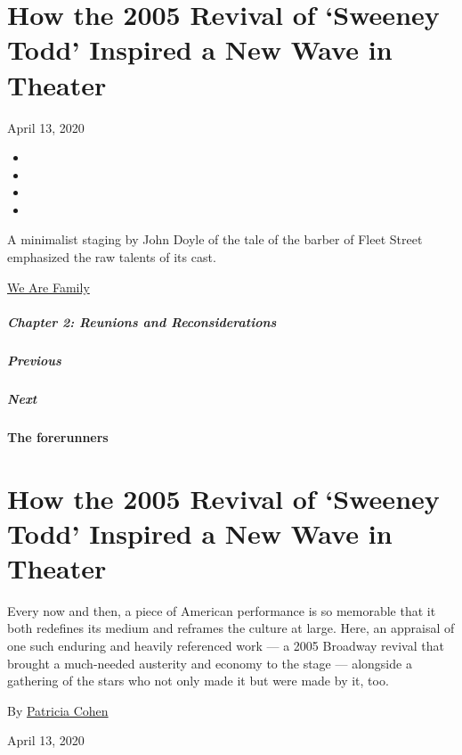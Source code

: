 \hypertarget{how-the-2005-revival-of-sweeney-todd-inspired-a-new-wave-in-theater}{%
\section{How the 2005 Revival of `Sweeney Todd' Inspired a New Wave in
Theater}\label{how-the-2005-revival-of-sweeney-todd-inspired-a-new-wave-in-theater}}

April 13, 2020

\begin{itemize}
\item
\item
\item
\item
\end{itemize}

A minimalist staging by John Doyle of the tale of the barber of Fleet
Street emphasized the raw talents of its cast.

\href{https://www.nytimes.com/interactive/2020/04/13/t-magazine/culture-issue-2020.html}{We
Are Family}

\hypertarget{chapter-2-reunions-and-reconsiderations}{%
\subparagraph{Chapter 2: Reunions and
Reconsiderations}\label{chapter-2-reunions-and-reconsiderations}}

\hypertarget{previous}{%
\subparagraph{Previous}\label{previous}}

\hypertarget{next}{%
\subparagraph{Next}\label{next}}

\textbf{The forerunners}

\hypertarget{how-the-2005-revival-of-sweeney-todd-inspired-a-new-wave-in-theater-1}{%
\section{How the 2005 Revival of `Sweeney Todd' Inspired a New Wave in
Theater}\label{how-the-2005-revival-of-sweeney-todd-inspired-a-new-wave-in-theater-1}}

Every now and then, a piece of American performance is so memorable that
it both redefines its medium and reframes the culture at large. Here, an
appraisal of one such enduring and heavily referenced work --- a 2005
Broadway revival that brought a much-needed austerity and economy to the
stage --- alongside a gathering of the stars who not only made it but
were made by it, too.

By \href{https://www.nytimes.com/by/patricia-cohen}{Patricia Cohen}

April 13, 2020

